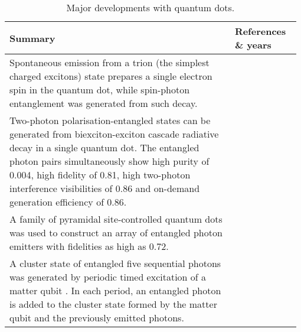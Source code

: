 \begin{table*}[!htbp]
	\begin{tabular}{|p{0.755\linewidth}|p{0.22\linewidth}|}
		\hline
	\textbf{Summary} & \textbf{References \& years} \\	\hline \hline
		Spontaneous emission from a trion (the simplest charged excitons) state prepares a single electron spin in the quantum dot, while spin-photon entanglement was generated from such decay. &  \cite{bib:de2012quantum, bib:gao2012observation} \\
		\hline
	    Two-photon polarisation-entangled states can be generated from biexciton-exciton cascade radiative decay in a single quantum dot. The entangled photon pairs simultaneously show high purity of 0.004, high fidelity of 0.81, high two-photon interference visibilities of 0.86 and on-demand generation efficiency of 0.86. & \cite{bib:muller2014demand} \\
		\hline
		A family of pyramidal site-controlled quantum dots was used to construct an array of entangled photon emitters with fidelities as high as 0.72. & \cite{bib:juska2013towards, bib:mohan2010polarization} \\
		\hline
		A cluster state of entangled five sequential photons was generated by periodic timed excitation of a matter qubit . In each period, an entangled photon is added to the cluster state formed by the matter qubit and the previously emitted photons. & \cite{bib:schwartz2016deterministic} \\
		\hline
	\end{tabular}
	\captionspacetab \caption{Major developments with quantum dots.} \label{tab:quantum_dots}
\end{table*}

